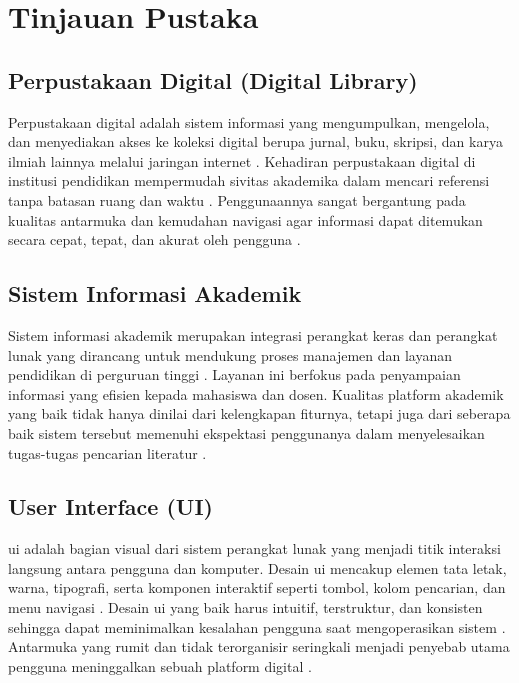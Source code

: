 \chapter{Tinjauan Pustaka}\label{cha:litreivew}

\section{Perpustakaan Digital (Digital Library)}
Perpustakaan digital adalah sistem informasi yang mengumpulkan, mengelola, dan menyediakan akses ke koleksi digital berupa jurnal, buku, skripsi, dan karya ilmiah lainnya melalui jaringan internet \cite{arms2001digital}. Kehadiran perpustakaan digital di institusi pendidikan mempermudah sivitas akademika dalam mencari referensi tanpa batasan ruang dan waktu \cite{pendit2008perpustakaan}. Penggunaannya sangat bergantung pada kualitas antarmuka dan kemudahan navigasi agar informasi dapat ditemukan secara cepat, tepat, dan akurat oleh pengguna \cite{saleh2020manajemen}.

\section{Sistem Informasi Akademik}
Sistem informasi akademik merupakan integrasi perangkat keras dan perangkat lunak yang dirancang untuk mendukung proses manajemen dan layanan pendidikan di perguruan tinggi \cite{jogiyanto2005analisis}. Layanan ini berfokus pada penyampaian informasi yang efisien kepada mahasiswa dan dosen. Kualitas platform akademik yang baik tidak hanya dinilai dari kelengkapan fiturnya, tetapi juga dari seberapa baik sistem tersebut memenuhi ekspektasi penggunanya dalam menyelesaikan tugas-tugas pencarian literatur \cite{delone2003delone}.

\section{User Interface (UI)}
\gls{ui} adalah bagian visual dari sistem perangkat lunak yang menjadi titik interaksi langsung antara pengguna dan komputer. Desain \gls{ui} mencakup elemen tata letak, warna, tipografi, serta komponen interaktif seperti tombol, kolom pencarian, dan menu navigasi \cite{tidwell2010designing}. Desain \gls{ui} yang baik harus intuitif, terstruktur, dan konsisten sehingga dapat meminimalkan kesalahan pengguna saat mengoperasikan sistem \cite{galitz2007essential}. Antarmuka yang rumit dan tidak terorganisir seringkali menjadi penyebab utama pengguna meninggalkan sebuah platform digital \cite{setiawan2023implementasi}.

